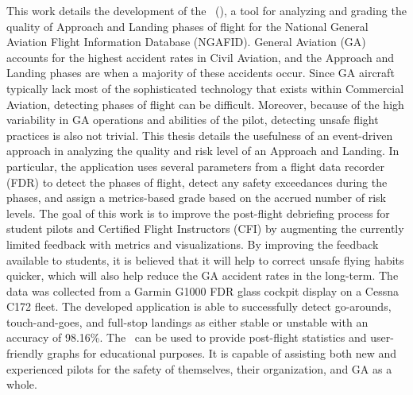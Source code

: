 
	This work details the development of the \toolname\ (\toolnameshort), a tool for analyzing and grading the quality of Approach and Landing phases of flight for the National General Aviation Flight Information Database (NGAFID).  General Aviation (GA) accounts for the highest accident rates in Civil Aviation, and the Approach and Landing phases are when a majority of these accidents occur.  Since GA aircraft typically lack most of the sophisticated technology that exists within Commercial Aviation, detecting phases of flight can be difficult.  Moreover, because of the high variability in GA operations and abilities of the pilot, detecting unsafe flight practices is also not trivial.  This thesis details the usefulness of an event-driven approach in analyzing the quality and risk level of an Approach and Landing.  In particular, the application uses several parameters from a flight data recorder (FDR) to detect the phases of flight, detect any safety exceedances during the phases, and assign a metrics-based grade based on the accrued number of risk levels.  The goal of this work is to improve the post-flight debriefing process for student pilots and Certified Flight Instructors (CFI) by augmenting the currently limited feedback with metrics and visualizations.  By improving the feedback available to students, it is believed that it will help to correct unsafe flying habits quicker, which will also help reduce the GA accident rates in the long-term.  The data was collected from a Garmin G1000 FDR glass cockpit display on a Cessna C172 fleet.  The developed application is able to successfully detect go-arounds, touch-and-goes, and full-stop landings as either stable or unstable with an accuracy of 98.16\%.  The \toolnameshort\ can be used to provide post-flight statistics and user-friendly graphs for educational purposes.  It is capable of assisting both new and experienced pilots for the safety of themselves, their organization, and GA as a whole.